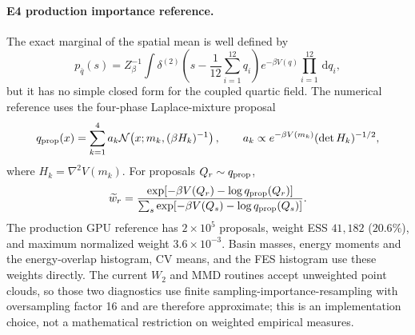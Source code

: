 \documentclass[11pt]{article}
\newcommand{\dd}{\,\mathrm{d}}
\begin{document}
\paragraph{E4 production importance reference.}
The exact marginal of the spatial mean is well defined by
\begin{equation}
 p_{\bar q}(s)
 =Z_\beta^{-1}\int
 \delta^{(2)}\!\left(s-\frac1{12}\sum_{i=1}^{12}q_i\right)
 e^{-\beta V(q)}\prod_{i=1}^{12}\dd q_i ,
\end{equation}
but it has no simple closed form for the coupled quartic field.  The numerical
reference uses the four-phase Laplace-mixture proposal
\begin{equation}
 q_{\rm prop}(x)=\sum_{k=1}^{4}a_k
 \mathcal N\!\left(x;m_k,(\beta H_k)^{-1}\right),\qquad
 a_k\propto e^{-\beta V(m_k)}(\det H_k)^{-1/2},
\end{equation}
where $H_k=\nabla^2V(m_k)$.  For proposals $Q_r\sim q_{\rm prop}$,
\begin{equation}
 \widetilde w_r=
 \frac{\exp[-\beta V(Q_r)-\log q_{\rm prop}(Q_r)]}
 {\sum_s\exp[-\beta V(Q_s)-\log q_{\rm prop}(Q_s)]}.
\end{equation}
The production GPU reference has $2\times10^5$ proposals, weight ESS
$41{,}182$ ($20.6\%$), and maximum normalized weight
$3.6\times10^{-3}$.  Basin masses, energy moments and the energy-overlap
histogram, CV means, and the FES histogram use these weights directly.  The
current $W_2$ and MMD routines
accept unweighted point clouds, so those two diagnostics use finite
sampling-importance-resampling with oversampling factor 16 and are therefore
approximate; this is an implementation choice, not a mathematical restriction
on weighted empirical measures.
\end{document}
